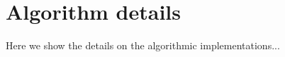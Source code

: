 
\renewcommand{\theequation}{A-\arabic{equation}}
\setcounter{section}{0}
 \setcounter{equation}{0}
\def\thesection       {A.\arabic{section}}

\section{Algorithm details}
\label{sec:algoDetails}


Here we show the details on the algorithmic implementations...

